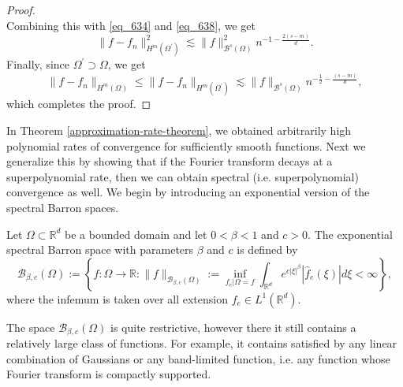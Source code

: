 \begin{proof}
\begin{equation}
 \end{equation}
 Combining this with \eqref{eq_634} and \eqref{eq_638}, we get
 \begin{equation}
  \|f - f_n\|^2_{H^m(\Omega^\prime)} \lesssim \|f\|^2_{\mathcal{B}^s(\Omega)}n^{-1-\frac{2(s-m)}{d}}.
 \end{equation}
 Finally, since $\Omega^\prime \supset \Omega$, we get
 \begin{equation}
  \|f - f_n\|_{H^m(\Omega)} \leq \|f - f_n\|_{H^m(\Omega^\prime)} \lesssim \|f\|_{\mathcal{B}^s(\Omega)}n^{-\frac{1}{2}-\frac{(s-m)}{d}},
 \end{equation}
 which completes the proof.
\end{proof}

In Theorem \ref{approximation-rate-theorem}, we obtained arbitrarily high polynomial rates of convergence for sufficiently smooth functions. Next we generalize this by showing that if the Fourier transform decays at a superpolynomial rate, then we can obtain spectral (i.e. superpolynomial) convergence as well. We begin by introducing an exponential version of the spectral Barron spaces.
\begin{definition}
Let $\Omega\subset \mathbb{R}^d$ be a bounded domain and let $0 < \beta < 1$ and $c > 0$. The exponential spectral Barron space with parameters $\beta$ and $c$ is defined by
\begin{equation}
 \mathcal{B}_{\beta,c}(\Omega):=\left\{f:\Omega\rightarrow\mathbb{R}:\|f\|_{\mathcal{B}_{\beta,c}(\Omega)}:=\inf_{f_e|\Omega = f}\int_{\mathbb{R}^d}e^{c|\xi|^\beta}|\hat{f}_e(\xi)|d\xi < \infty\right\},
\end{equation}
where the infemum is taken over all extension $f_e\in L^1(\mathbb{R}^d)$.
\end{definition}
 The space $\mathcal{B}_{\beta,c}(\Omega)$ is quite restrictive, however there it still contains a relatively large class of functions. For example, it contains satisfied by any linear combination of Gaussians or any band-limited function, i.e. any function whose Fourier transform is compactly supported.


